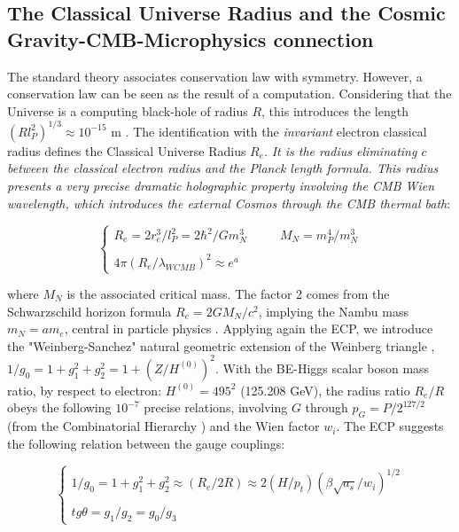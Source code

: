\documentclass[a4paper,9pt]{article}
\begin{document}
% 

\subsection{The Classical Universe Radius and the Cosmic Gravity-CMB-Microphysics connection}

The standard theory associates conservation law with symmetry. However, a conservation law can be seen as the result of a computation. Considering that the Universe is a computing black-hole of radius $R$, this introduces the length $(Rl_P^2)^{1/3} \approx 10^{-15} $ m \cite{Sanchez5}. The identification with the \textit{invariant} electron classical radius defines the Classical Universe Radius $R_e$. \textit{It is the radius eliminating $c$ between the classical electron radius and the Planck length formula. This radius presents a very precise dramatic holographic property involving the CMB Wien wavelength, which introduces the external Cosmos through the CMB thermal bath}:

\begin{equation}\label{Eq5}
 \left\{
    \begin{array}{ll}
    R_e = 2r_e^3/l_P^2 = 2 \hbar^2/Gm_N^3 ~~~~~~~~~~~~ M_N = m_P^4/m_N^3 \\
    \\
   4\pi(R_e/\lambda_{WCMB})^2 \approx e^a
    
    \end{array}
\right.
\end{equation}

where $M_N$ is the associated critical mass. The factor 2 comes from the Schwarzschild horizon formula $R_e  = 2GM_N /c^2$, implying the Nambu mass $m_N = am_e$, central in particle physics \cite{Nambu}. Applying again the ECP, we introduce the "Weinberg-Sanchez" natural geometric extension of the Weinberg triangle \cite{Taylor}, $1/g_0 = 1+g_1^2 +g_2^2 = 1 + (Z/H^{(0)})^2$. With the BE-Higgs scalar boson mass ratio, by respect to electron:  $H^{(0)} = 495^2$ (125.208 GeV)\cite{Sanchez2}, the radius ratio $R_e/R$ obeys the following $10^{-7}$ precise relations, involving $G$ through $p_G = P/2^{127/2}$ (from the Combinatorial Hierarchy \cite{Bastin}) and the Wien factor $w_i$. The ECP suggests the following relation between the gauge couplings: 


\begin{equation}\label{Eq5}
 \left\{
    \begin{array}{ll}
    1/g_0 = 1+g_1^2 +g_2^2 \approx (R_e/2R) \approx 2(H/p_t)(\beta \sqrt {a_s}/w_i)^{1/2}\\
    \\
   tg \theta =  g_1/g_2 = g_0/g_3
    
    \end{array}
\right.
\end{equation}
\end{document}

